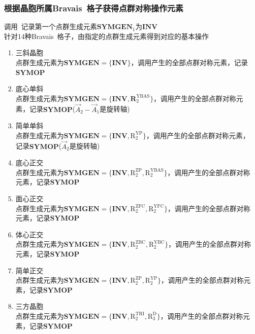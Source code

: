 \documentclass{article}      %
\begin{document}
\subsubsection{根据晶胞所属\rm{Bravais~}格子获得点群对称操作元素}
调用~记录第一个点群生成元素$\mathbf{SYMGEN}_1$为$\mathbf{INV}$\\
针对14种\textrm{Bravais~}格子，由指定的点群生成元素得到对应的基本操作
\begin{enumerate}
	\item 三斜晶胞\\点群生成元素为$\mathbf{SYMGEN}=\{\mathbf{INV}\}$，调用产生的全部点群对称元素，记录$\mathbf{SYMOP}$
	\item 底心单斜\\点群生成元素为$\mathbf{SYMGEN}=\{\mathbf{INV},\mathbf{R}_2^{\mathrm{YBAS}}\}$，调用产生的全部点群对称元素，记录$\mathbf{SYMOP}$($\vec A_2-\vec A_1$是旋转轴)
	\item 简单单斜\\点群生成元素为$\mathbf{SYMGEN}=\{\mathbf{INV},\mathrm{R}_2^{\mathrm{YP}}\}$，调用产生的全部点群对称元素，记录$\mathbf{SYMOP}$($\vec A_2$是旋转轴)
	\item 底心正交\\点群生成元素为$\mathbf{SYMGEN}=\{\mathbf{INV},\mathrm{R}_2^{\mathrm{ZP}},\mathrm{R}_2^{\mathrm{YBAS}}\}$，调用产生的全部点群对称元素，记录$\mathbf{SYMOP}$
	\item 面心正交\\点群生成元素为$\mathbf{SYMGEN}=\{\mathbf{INV},\mathrm{R}_2^{\mathrm{ZFC}},\mathrm{R}_2^{\mathrm{YFC}}\}$，调用产生的全部点群对称元素，记录$\mathbf{SYMOP}$
	\item 体心正交\\点群生成元素为$\mathbf{SYMGEN}=\{\mathbf{INV},\mathrm{R}_2^{\mathrm{ZBC}},\mathrm{R}_2^{\mathrm{YBC}}\}$，调用产生的全部点群对称元素，记录$\mathbf{SYMOP}$
	\item 简单正交\\点群生成元素为$\mathbf{SYMGEN}=\{\mathbf{INV},\mathrm{R}_2^{\mathrm{ZP}},\mathrm{R}_2^{\mathrm{YP}}\}$，调用产生的全部点群对称元素，记录$\mathbf{SYMOP}$
	\item 三方晶胞\\点群生成元素为$\mathbf{SYMGEN}=\{\mathbf{INV},\mathrm{R}_2^{\mathrm{TRI}},\mathrm{R}_3^{\mathrm{D}}\}$，调用产生的全部点群对称元素，记录$\mathbf{SYMOP}$

\end{enumerate}
\end{document}
